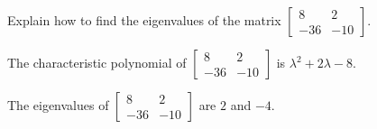 
\begin{exerciseStatement}


Explain how to find the eigenvalues of the matrix \( \left[\begin{array}{cc}
8 & 2 \\
-36 & -10
\end{array}\right] \).


\end{exerciseStatement}
    
\begin{exerciseAnswer} 


The characteristic polynomial of \( \left[\begin{array}{cc}
8 & 2 \\
-36 & -10
\end{array}\right] \) is \( \lambda^{2} + 2 \lambda - 8 \).



The eigenvalues of \( \left[\begin{array}{cc}
8 & 2 \\
-36 & -10
\end{array}\right] \) are \( 2 \) and \( -4 \).


\end{exerciseAnswer}
    
